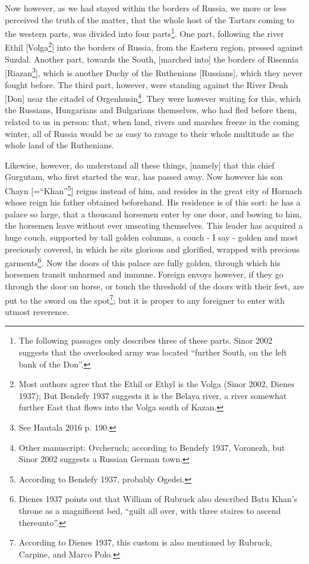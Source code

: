 Now however, as we had stayed within the borders of Russia, we more or less perceived the truth of the matter, that the whole host of the Tartars coming to the western parts, was divided into four parts\footnote{The following passages only describes three of these parts. Sinor 2002 suggests that the overlooked army was located ``further South, on the left bank of the Don''.}. One part, following the river Ethil [Volga\footnote{Most authors agree that the Ethil or Ethyl is the Volga (Sinor 2002, Dienes 1937); But Bendefy 1937 suggests it is the Belaya river, a river somewhat further East that flows into the Volga south of Kazan.}] into the borders of Russia, from the Eastern region, pressed against Suzdal. Another part, towards the South, [marched into] the borders of Risennia [Riazan\footnote{See Hautala 2016 p. 190.}], which is another Duchy of the Ruthenians [Russians], which they never fought before. The third part, however, were standing against the River Denh [Don] near the citadel of Orgenhusin\footnote{Other manuscript: Ovcheruch; according to Bendefy 1937, Voronezh, but Sinor 2002 suggests a Russian German town.}. They were however waiting for this, which the Russians, Hungarians and Bulgarians themselves, who had fled before them, related to us in person: that, when land, rivers and marshes freeze in the coming winter, all of Russia would be as easy to ravage to their whole multitude as the whole land of the Ruthenians.

Likewise, however, do understand all these things, [namely] that this chief Gurgutam, who first started the war, has passed away. Now however his son Chayn [=``Khan''\footnote{According to Bendefy 1937, probably Ogedei.}] reigns instead of him, and resides in the great city of Hornach whose reign his father obtained beforehand. His residence is of this sort: he has a palace so large, that a thousand horsemen enter by one door, and bowing to him, the horsemen leave without ever unseating themselves. This leader has acquired a huge couch, supported by tall golden columns, a couch - I say - golden and most preciously covered, in which he sits glorious and glorified, wrapped with precious garments\footnote{Dienes 1937 points out that William of Rubruck also described Batu Khan's throne as a magnificent bed, ``guilt all over, with three staires to ascend thereunto''.}. Now the doors of this palace are fully golden, through which his horsemen transit unharmed and immune. Foreign envoys however, if they go through the door on horse, or touch the threshold of the doors with their feet, are put to the sword on the spot\footnote{According to Dienes 1937, this custom is also mentioned by Rubruck, Carpine, and Marco Polo.}; but it is proper to any foreigner to enter with utmost reverence.

